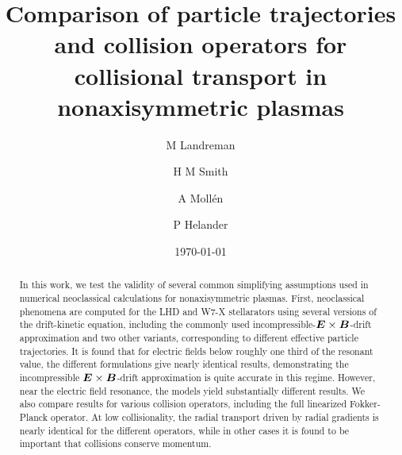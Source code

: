 \documentclass[12pt,superscriptaddress]{revtex4}
\newcommand{\vect}[1]{\mbox{\boldmath $#1$}}
\begin{document}
\title{Comparison of particle trajectories and collision operators for collisional transport in nonaxisymmetric plasmas}




\author{M Landreman}
\author{H M Smith}
\author{A Moll\'{e}n}
\author{P Helander}


\date{\today}

\begin{abstract}

In this work, we test the validity of several common simplifying assumptions used in numerical neoclassical calculations
for nonaxisymmetric plasmas.
First, neoclassical phenomena are computed for the LHD and W7-X stellarators using several versions of the drift-kinetic
equation, 
including the commonly used incompressible-$\vect{E}\times\vect{B}$-drift approximation
and two other variants,
corresponding to different effective particle trajectories.
It is found that
for electric fields below roughly one third of the resonant value, the different formulations give
nearly identical results, demonstrating the incompressible $\vect{E}\times\vect{B}$-drift approximation
is quite accurate in this regime. 
However, near the electric field resonance,
the models yield substantially different results.
We also compare results for various collision operators, including the full linearized Fokker-Planck operator.
At low collisionality, the radial transport driven by radial
gradients is nearly identical for the different operators,
while in other cases it is found to be important that collisions conserve momentum.

\end{abstract}
\end{document}
